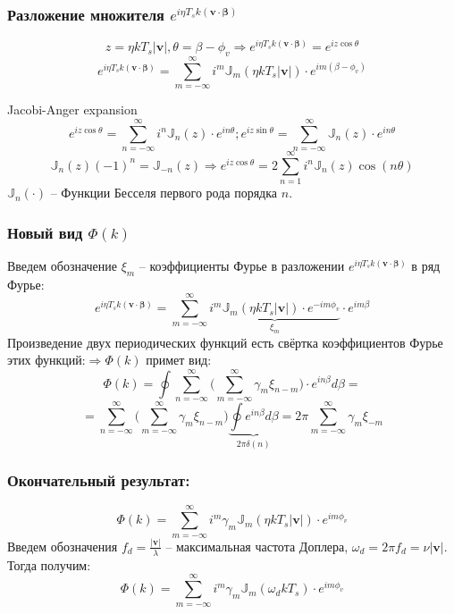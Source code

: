 \documentclass[utf8]{beamer}
\begin{document}
\begin{frame}
\frametitle{Разложение множителя $e^{i \eta T_s k (\boldsymbol{v} \cdot \boldsymbol{\beta})}$}
$$
z=\eta k T_s |\boldsymbol{v}|, \theta = \beta - \phi_v \Rightarrow
e^{i \eta T_s k (\boldsymbol{v} \cdot \boldsymbol{\beta})} = e^{iz\cos \theta}
$$
$$
e^{i \eta T_s k (\boldsymbol{v} \cdot \boldsymbol{\beta})} =
\sum_{m=-\infty}^\infty
i^m \mathbb{J}_m (\eta k T_s |\boldsymbol{v}|)\cdot e^{i m (\beta-\phi_v)}
$$
\begin{block}{Jacobi-Anger expansion}
$$
e^{iz \cos \theta} = \sum_{n=-\infty}^{\infty} i^n\mathbb{J}_n(z) \cdot e^{in \theta};
e^{iz \sin \theta} = \sum_{n=-\infty}^{\infty} \mathbb{J}_n(z) \cdot e^{in \theta}
$$
$$
\mathbb{J}_n(z) (-1)^n = \mathbb{J}_{-n}(z)\Rightarrow e^{iz \cos \theta} = 2\sum_{n=1}^{\infty}i^n \mathbb{J}_n(z) \cos (n\theta)
$$
$\mathbb{J}_n(\cdot)$ -- Функции Бесселя первого рода порядка $n$.
\end{block}
\end{frame}
\begin{frame}
\frametitle{Новый вид $\Phi(k)$}
Введем обозначение $\xi_m$ -- коэффициенты Фурье в разложении $e^{i \eta T_s k (\boldsymbol{v} \cdot \boldsymbol{\beta})}$ в ряд Фурье:
$$
e^{i \eta T_s k (\boldsymbol{v} \cdot \boldsymbol{\beta})} = \sum_{m=-\infty}^\infty
\underbrace{
i^m \mathbb{J}_m (\eta k T_s |\boldsymbol{v}|)\cdot e^{-im \phi_v}
}_{\xi_m}
\cdot e^{im\beta}
$$
Произведение двух периодических функций есть свёртка коэффициентов
Фурье этих функций:$\Rightarrow \Phi(k)$ примет вид:
$$
\Phi(k) = \oint \sum_{n=-\infty}^{\infty} \Big( \sum_{m=-\infty}^{\infty} \gamma_m \xi_{n-m}\Big)\cdot e^{in\beta}d\beta =
$$
$$
 = \sum_{n=-\infty}^{\infty} \Big( \sum_{m=-\infty}^{\infty} \gamma_m \xi_{n-m}\Big)\underbrace{\oint e^{in\beta}d\beta}_{2\pi \delta(n)} =
2\pi \sum_{m=-\infty}^{\infty} \gamma_m \xi_{-m}
$$
\end{frame}
\begin{frame}
\frametitle{Окончательный результат:}
$$
\Phi(k) = \sum_{m=-\infty}^{\infty} i^m \gamma_m \mathbb{J}_m (\eta k T_s |\boldsymbol{v}|)\cdot e^{im \phi_v}
$$
Введем обозначения $f_d = \frac{|\boldsymbol{v}|}{\lambda}$ -- максимальная частота Доплера, $\omega_d = 2\pi f_d = \nu |\boldsymbol{v}|$. Тогда получим:
$$
\Phi(k) = \sum_{m=-\infty}^{\infty} i^m \gamma_m \mathbb{J}_m (\omega_d k T_s)\cdot e^{im \phi_v}
$$
\end{frame}
\end{document}
